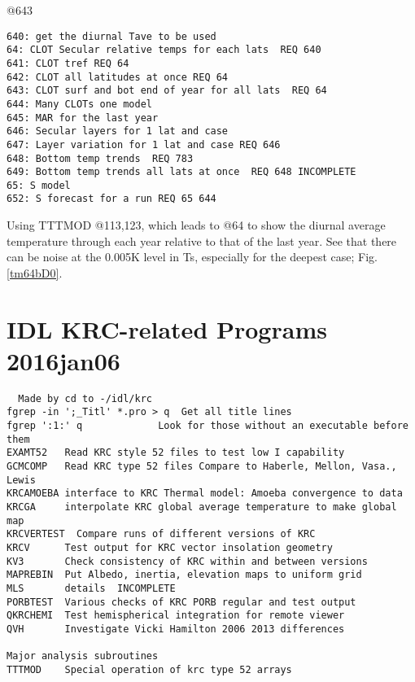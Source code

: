 \documentclass{article}
\begin{document}
@643 
\vspace{-3.mm} 
\begin{verbatim}
640: get the diurnal Tave to be used 
64: CLOT Secular relative temps for each lats  REQ 640
641: CLOT tref REQ 64
642: CLOT all latitudes at once REQ 64
643: CLOT surf and bot end of year for all lats  REQ 64
644: Many CLOTs one model
645: MAR for the last year
646: Secular layers for 1 lat and case
647: Layer variation for 1 lat and case REQ 646
648: Bottom temp trends  REQ 783
649: Bottom temp trends all lats at once  REQ 648 INCOMPLETE
65: S model
652: S forecast for a run REQ 65 644
\end{verbatim}


Using TTTMOD @113,123, which leads to @64 to show the diurnal average temperature
through each year relative to that of the last year.  See that there can be
noise at the 0.005K level in Ts, especially for the deepest case;
Fig. \ref{tm64bD0}.

\section{IDL KRC-related Programs 2016jan06}
\vspace{-3.mm} 
\begin{verbatim}
  Made by cd to -/idl/krc  
fgrep -in ';_Titl' *.pro > q  Get all title lines
fgrep ':1:' q             Look for those without an executable before them
EXAMT52   Read KRC style 52 files to test low I capability
GCMCOMP   Read KRC type 52 files Compare to Haberle, Mellon, Vasa., Lewis
KRCAMOEBA interface to KRC Thermal model: Amoeba convergence to data
KRCGA     interpolate KRC global average temperature to make global map
KRCVERTEST  Compare runs of different versions of KRC
KRCV      Test output for KRC vector insolation geometry
KV3       Check consistency of KRC within and between versions
MAPREBIN  Put Albedo, inertia, elevation maps to uniform grid
MLS       details  INCOMPLETE
PORBTEST  Various checks of KRC PORB regular and test output
QKRCHEMI  Test hemispherical integration for remote viewer
QVH       Investigate Vicki Hamilton 2006 2013 differences

Major analysis subroutines
TTTMOD    Special operation of krc type 52 arrays
\end{verbatim} 
\end{document}
